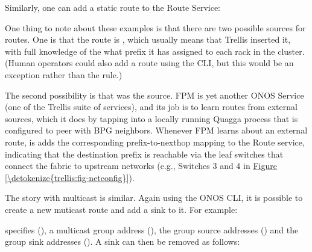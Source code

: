 \documentclass[letterpaper,11pt,english]{sphinxmanual}
\begin{document}
Similarly, one can add a static route to the Route Service:

\begin{sphinxVerbatim}[commandchars=\\\{\}]
\end{sphinxVerbatim}

One thing to note about these examples is that there are two possible
sources for routes. One is that the route is , which usually
means that Trellis inserted it, with full knowledge of the what prefix
it has assigned to each rack in the cluster. (Human operators could
also add a  route using the CLI, but this would be an
exception rather than the rule.)

The second possibility is that  was the source. FPM is yet
another ONOS Service (one of the Trellis suite of services), and its
job is to learn routes from external sources, which it does by tapping
into a locally running Quagga process that is configured to peer with
BPG neighbors. Whenever FPM learns about an external route, is adds
the corresponding prefix-to-nexthop mapping to the Route service,
indicating that the destination prefix is reachable via the leaf
switches that connect the fabric to upstream networks (e.g., Switches 3
and 4 in \hyperref[\detokenize{trellis:fig-netconfig}]{Figure \ref{\detokenize{trellis:fig-netconfig}}}).

The story with multicast is similar. Again using the ONOS CLI, it is
possible to create a new muticast route and add a sink to it. For example:

\begin{sphinxVerbatim}[commandchars=\\\{\}]
\end{sphinxVerbatim}

specifies   (), a multicast group address
(), the group source addresses () and the group sink
addresses (). A sink can then be removed as follows:
\end{document}
